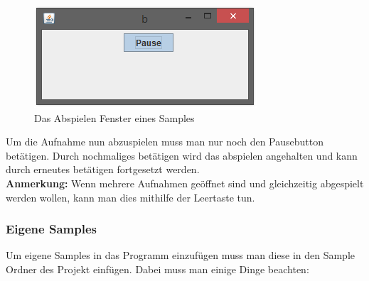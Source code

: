 \begin{figure}[hbtp]
\centering
\includegraphics[scale=0.9]{Bilder/abspielenbsp.PNG}
\caption{Das Abspielen Fenster eines Samples}
\end{figure}

Um die Aufnahme nun abzuspielen muss man nur noch den Pausebutton betätigen. Durch nochmaliges betätigen wird das abspielen angehalten und kann durch erneutes betätigen fortgesetzt werden.\\

\textbf{Anmerkung:} Wenn mehrere Aufnahmen geöffnet sind und gleichzeitig abgespielt werden wollen, kann man dies mithilfe der Leertaste tun.


\subsubsection{Eigene Samples}
 
 
 Um eigene Samples in das Programm einzufügen muss man diese in den Sample Ordner des Projekt einfügen. Dabei muss man einige Dinge beachten:
 

